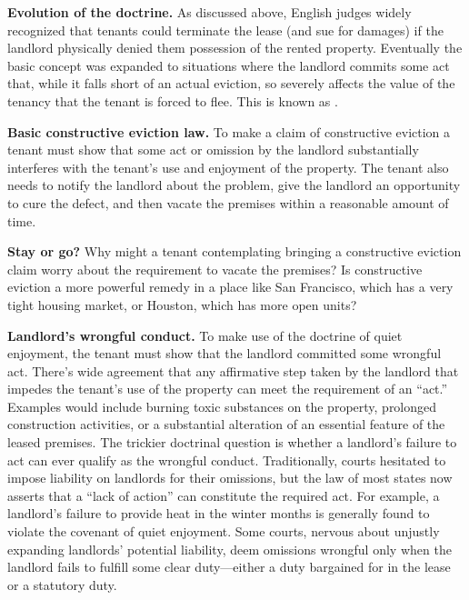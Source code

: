 
\item \textbf{Evolution of the doctrine.}  As discussed above, English judges
widely recognized that tenants could terminate the lease (and sue for damages)
if the landlord physically denied them possession of the rented property. 
Eventually the basic concept was expanded to situations where the landlord
commits some act that, while it falls short of an actual eviction, so severely
affects the value of the tenancy that the tenant is forced to flee.  This is
known as .  


\item \textbf{Basic constructive eviction law.} To make a claim of constructive
eviction a tenant must show that some act or omission by the landlord
substantially interferes with the tenant's use and enjoyment of the property. 
The tenant also needs to notify the landlord about the problem, give the
landlord an opportunity to cure the defect, and then vacate the premises within
a reasonable amount of time.


\item \textbf{Stay or go?} Why might a tenant contemplating bringing a
constructive eviction claim worry about the requirement to vacate the premises?
 Is constructive eviction a more powerful remedy in a place like San Francisco,
which has a very tight housing market, or Houston, which has more open units?  


\item \textbf{Landlord's wrongful conduct.}  To make use of the doctrine of
quiet enjoyment, the tenant must show that the landlord committed some wrongful
act.  There's wide agreement that any affirmative step taken by the landlord
that impedes the tenant's use of the property can meet the requirement of an
``act.''  Examples would include burning toxic substances on the property,
prolonged construction activities, or a substantial alteration of an essential
feature of the leased premises.  The trickier doctrinal question is whether a
landlord's failure to act can ever qualify as the wrongful conduct. 
Traditionally, courts hesitated to impose liability on landlords for their
omissions, but the law of most states now asserts that a ``lack of action'' can
constitute the required act. For example, a landlord's failure to provide heat
in the winter months is generally found to violate the covenant of quiet
enjoyment. Some courts, nervous about unjustly expanding landlords' potential
liability, deem omissions wrongful only when the landlord fails to fulfill some
clear duty---either a duty bargained for in the lease or a statutory duty.


